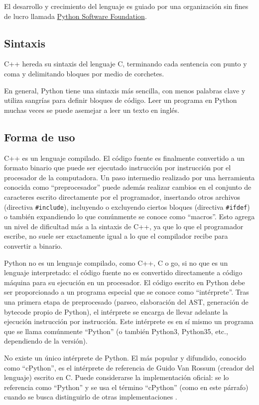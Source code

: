 El desarrollo y crecimiento del lenguaje es guiado por una organización sin
fines de lucro llamada \href{https://www.python.org/psf/}{Python Software
Foundation}.

\subsection{Sintaxis}

C++ hereda su sintaxis del lenguaje C, terminando cada sentencia con punto y
coma y delimitando bloques por medio de corchetes. 

En general, Python tiene una sintaxis más sencilla, con menos palabras clave y
utiliza sangrías para definir bloques de código. Leer un programa en Python
muchas veces se puede asemejar a leer un texto en inglés.

\subsection{Forma de uso}

C++ es un lenguaje compilado. El código fuente es finalmente convertido a un
formato binario que puede ser ejecutado instrucción por instrucción por el
procesador de la computadora. Un paso intermedio realizado por una herramienta
conocida como ``preprocesador'' puede además realizar cambios en el conjunto de
caracteres escrito directamente por el programador, insertando otros archivos
(directiva \verb!#include!), incluyendo o excluyendo ciertos bloques (directiva
\verb!#ifdef!) o también expandiendo lo que comúnmente se conoce como ``macros''.
Esto agrega un nivel de dificultad más a la sintaxis de C++, ya que lo que el
programador escribe, no suele ser exactamente igual a lo que el compilador
recibe para convertir a binario.

Python no es un lenguaje compilado, como C++, C o go, si no que es un lenguaje
interpretado: el código fuente no es convertido directamente a código máquina
para su ejecución en un procesador. El código escrito en Python debe ser
proporcionado a un programa especial que se conoce como ``intérprete''. Tras
una primera etapa de preprocesado (parseo, elaboración del AST, generación de
bytecode propio de Python), el intérprete se encarga de llevar adelante la
ejecución instrucción por instrucción. Este intérprete es en sí mismo un
programa que se llama comúnmente ``Python'' (o también Python3, Python35,
etc., dependiendo de la versión).

No existe un único intérprete de Python. El más popular y difundido, conocido
como ``cPython'', es el intérprete de referencia de Guido Van Rossum (creador
del lenguaje) escrito en C. Puede considerarse la implementación oficial: se lo
referencia como ``Python'' y se usa el término ``cPython'' (como en este
párrafo) cuando se busca distinguirlo de otras implementaciones \cite{pythonimpl}.

